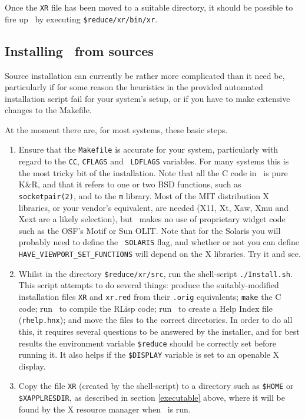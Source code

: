 Once the {\tt XR} file has been moved to a suitable directory, it
should be possible to fire up \xr\ by executing
{\tt\$reduce/xr/bin/xr}.

\subsection{Installing \xr\ from sources}

Source installation can currently be rather more complicated than it
need be, particularly if for some reason the heuristics in the
provided automated installation script fail for your system's setup,
or if you have to make extensive changes to the Makefile.

At the moment there are, for most systems, these basic steps.

\begin{enumerate}

\item Ensure that the {\tt Makefile} is accurate for your system,
particularly with regard to the {\tt CC}, {\tt CFLAGS} and {\tt
LDFLAGS} variables.  For many systems this is the most tricky bit of
the installation.  Note that all the C code in \xr\ is pure K\&R, and
that it refers to one or two BSD functions, such as {\tt
socketpair(2)}, and to the {\tt m} library.  Most of the MIT
distribution X libraries, or your vendor's equivalent, are needed
(X11, Xt, Xaw, Xmu and Xext are a likely selection), but \xr\ makes no
use of proprietary widget code such as the OSF's Motif or Sun OLIT.
Note that for the Solaris you will probably need to define the {\tt
SOLARIS} flag, and whether or not you can define {\tt
HAVE\_VIEWPORT\_SET\_FUNCTIONS} will depend on the X libraries.  Try
it and see.

\item Whilst in the directory {\tt\$reduce/xr/src}, run the
shell-script {\tt ./Install.sh}.  This script attempts to do several
things: produce the suitably-modified installation files {\tt XR} and
{\tt xr.red} from their {\tt .orig} equivalents; {\tt make} the C
code; run \REDUCE\ to compile the RLisp code; run \xr\ to create a
Help Index file ({\tt rhelp.hnx}); and move the files to the correct
directories.  In order to do all this, it requires several questions
to be answered by the installer, and for best results the environment
variable {\tt\$reduce} should be correctly set before running it.  It
also helps if the {\tt\$DISPLAY} variable is set to an openable X
display.

\item Copy the file {\tt XR} (created by the shell-script) to a
directory such as {\tt\$HOME} or {\tt\$XAPPLRESDIR}, as described in
section \ref{executable} above, where it will be found by the X
resource manager when \xr\ is run.  \end{enumerate}

